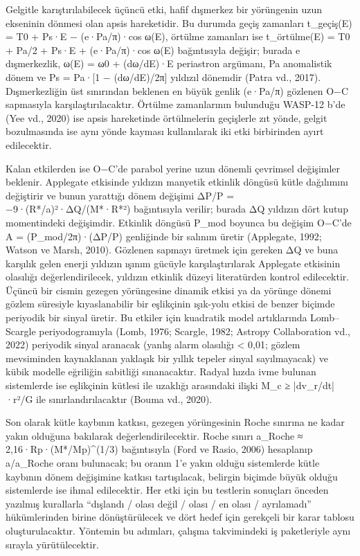 Gelgitle karıştırılabilecek üçüncü etki, hafif dışmerkez bir yörüngenin uzun ekseninin dönmesi olan apsis hareketidir. Bu durumda geçiş zamanları t\_geçiş(E) = T0 + Ps·E − (e·Pa/π)·cos ω(E), örtülme zamanları ise t\_örtülme(E) = T0 + Pa/2 + Ps·E + (e·Pa/π)·cos ω(E) bağıntısıyla değişir; burada e dışmerkezlik, ω(E) = ω0 + (dω/dE)·E periastron argümanı, Pa anomalistik dönem ve Ps = Pa·[1 − (dω/dE)/2π] yıldızıl dönemdir (Patra vd., 2017). Dışmerkezliğin üst sınırından beklenen en büyük genlik (e·Pa/π) gözlenen O−C sapmasıyla karşılaştırılacaktır. Örtülme zamanlarının bulunduğu WASP-12 b'de (Yee vd., 2020) ise apsis hareketinde örtülmelerin geçişlerle zıt yönde, gelgit bozulmasında ise aynı yönde kayması kullanılarak iki etki birbirinden ayırt edilecektir.

Kalan etkilerden ise O−C'de parabol yerine uzun dönemli çevrimsel değişimler beklenir. Applegate etkisinde yıldızın manyetik etkinlik döngüsü kütle dağılımını değiştirir ve bunun yarattığı dönem değişimi ΔP/P = −9·(R*/a)²·ΔQ/(M*·R*²) bağıntısıyla verilir; burada ΔQ yıldızın dört kutup momentindeki değişimdir. Etkinlik döngüsü P\_mod boyunca bu değişim O−C'de A = (P\_mod/2π)·(ΔP/P) genliğinde bir salınım üretir (Applegate, 1992; Watson ve Marsh, 2010). Gözlenen sapmayı üretmek için gereken ΔQ ve buna karşılık gelen enerji yıldızın ışınım gücüyle karşılaştırılarak Applegate etkisinin olasılığı değerlendirilecek, yıldızın etkinlik düzeyi literatürden kontrol edilecektir. Üçüncü bir cismin gezegen yörüngesine dinamik etkisi ya da yörünge dönemi gözlem süresiyle kıyaslanabilir bir eşlikçinin ışık-yolu etkisi de benzer biçimde periyodik bir sinyal üretir. Bu etkiler için kuadratik model artıklarında Lomb–Scargle periyodogramıyla (Lomb, 1976; Scargle, 1982; Astropy Collaboration vd., 2022) periyodik sinyal aranacak (yanlış alarm olasılığı < 0,01; gözlem mevsiminden kaynaklanan yaklaşık bir yıllık tepeler sinyal sayılmayacak) ve kübik modelle eğriliğin sabitliği sınanacaktır. Radyal hızda ivme bulunan sistemlerde ise eşlikçinin kütlesi ile uzaklığı arasındaki ilişki M\_c ≥ |dv\_r/dt|·r²/G ile sınırlandırılacaktır (Bouma vd., 2020).

Son olarak kütle kaybının katkısı, gezegen yörüngesinin Roche sınırına ne kadar yakın olduğuna bakılarak değerlendirilecektir. Roche sınırı a\_Roche ≈ 2,16·Rp·(M*/Mp)\textasciicircum{}(1/3) bağıntısıyla (Ford ve Rasio, 2006) hesaplanıp a/a\_Roche oranı bulunacak; bu oranın 1'e yakın olduğu sistemlerde kütle kaybının dönem değişimine katkısı tartışılacak, belirgin biçimde büyük olduğu sistemlerde ise ihmal edilecektir. Her etki için bu testlerin sonuçları önceden yazılmış kurallarla “dışlandı / olası değil / olası / en olası / ayrılamadı” hükümlerinden birine dönüştürülecek ve dört hedef için gerekçeli bir karar tablosu oluşturulacaktır. Yöntemin bu adımları, çalışma takvimindeki iş paketleriyle aynı sırayla yürütülecektir.

